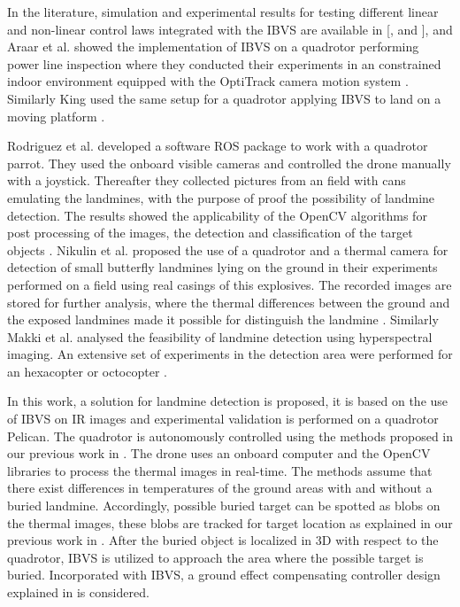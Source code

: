 \documentclass[conference]{IEEEtran}
\begin{document}
In the literature, simulation and experimental results for testing different linear and non-linear control laws integrated with the IBVS are available in [\cite{Zheng2018}, \cite{Jabbari2012} and \cite{Bourquardez2009}], and Araar et al. showed the implementation of IBVS on a quadrotor performing power line inspection where they conducted their experiments in an constrained indoor environment equipped with the OptiTrack camera motion system \cite{Araar2014}. Similarly King used the same setup for a quadrotor applying IBVS to land on a moving platform \cite{King2017}. 

Rodriguez et al. developed a software ROS package to work with a quadrotor parrot. They used the onboard visible cameras and controlled the drone manually with a joystick. Thereafter they collected pictures from an field with cans emulating the landmines, with the purpose of proof the possibility of landmine detection. The results showed the applicability of the OpenCV algorithms for post processing of the images, the detection and classification of the target objects \cite{Rodriguez2014}. Nikulin et al. proposed the use of a quadrotor and a thermal camera for detection of small butterfly landmines lying on the ground in their experiments performed on a field using real casings of this explosives. The recorded images are stored for further analysis, where the thermal differences between the ground and the exposed landmines made it possible for distinguish the landmine \cite{Nikulin2018}. Similarly Makki et al. analysed the feasibility of landmine detection using hyperspectral imaging. An extensive set of experiments in the detection area were performed for an hexacopter or octocopter \cite{Makki2018}.

In this work, a solution for landmine detection is proposed, it is based on the use of IBVS on IR images and experimental validation is performed on a quadrotor Pelican. The quadrotor is autonomously controlled using the methods proposed in our previous work in \cite{DenaRuiz2017_1}. The drone uses an onboard computer and the OpenCV libraries to process the thermal images in real-time. The methods assume that there exist differences in temperatures of the ground areas with and without a buried landmine. Accordingly, possible buried target can be spotted as blobs on the thermal images, these blobs are tracked for target location as explained in our previous work in \cite{DenaRuiz2017_2}. After the buried object is localized in 3D with respect to the quadrotor, IBVS is utilized to approach the area where the possible target is buried. Incorporated with IBVS, a ground effect compensating controller design explained in \cite{DenaRuiz2019_1} is considered. 
\end{document}
